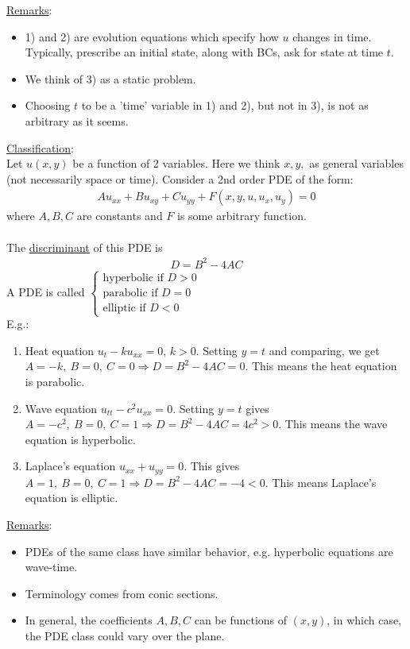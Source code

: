 \documentclass[12pt, letterpaper]{article}
\begin{document}
\underline{Remarks}:
\begin{itemize}
    \item 1) and 2) are evolution equations which specify how $u$ changes in time. Typically, 
    prescribe an initial state, along with BCs, ask for state at time $t$.
    \item We think of 3) as a static problem.
    \item Choosing $t$ to be a 'time' variable in 1) and 2), but not in 3), is not as arbitrary 
    as it seems.
\end{itemize}
\underline{Classification}: \\
Let $u(x,y)$ be a function of 2 variables. Here we think $x,y,$ as general variables (not 
necessarily space or time). Consider a 2nd order PDE of the form:
\begin{align*}
    Au_{xx} + Bu_{xy} + Cu_{yy} + F(x,y,u,u_x, u_y) = 0 
\end{align*}
where $A,B,C$ are constants and $F$ is some arbitrary function. \\ \\ 
The \underline{discriminant} of this PDE is 
\begin{align*}
    \boxed{D = B^2 - 4AC}
\end{align*}
A PDE is called $\begin{cases}
    \text{hyperbolic if } D > 0 \\
    \text{parabolic if } D = 0 \\
    \text{elliptic if } D < 0
\end{cases}$ \\
E.g.:
\begin{enumerate}[1)]
    \item Heat equation $u_t - ku_{xx} = 0$, $k > 0$. Setting $y = t$ and comparing, we get 
    $A = -k,\ B = 0,\ C = 0 \Rightarrow D = B^2 -4AC = 0$. This means the heat equation is 
    parabolic.
    \item Wave equation $u_{tt} - c^2u_{xx} = 0$. Setting $y = t$ gives $A = -c^2,\ B = 0,
    \ C = 1 \Rightarrow D = B^2 - 4AC = 4c^2 > 0$. This means the wave equation is hyperbolic.
    \item Laplace's equation $u_{xx} + u_{yy} = 0$. This gives $A = 1,\ B = 0,\ C = 1 
    \Rightarrow D = B^2 -4AC = -4 < 0$. This means Laplace's equation is elliptic.
\end{enumerate}
\underline{Remarks}:
\begin{itemize}
    \item PDEs of the same class have similar behavior, e.g. hyperbolic equations are wave-time.
    \item Terminology comes from conic sections.
    \item In general, the coefficients $A,B,C$ can be functions of $(x,y)$, in which case, the 
    PDE class could vary over the plane.
\end{itemize}
\end{document}
